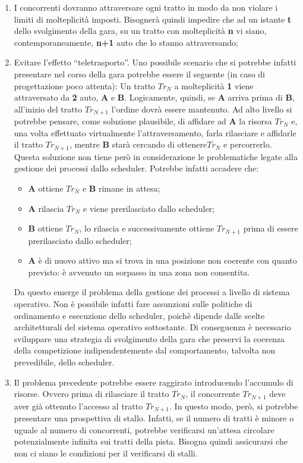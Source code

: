 \begin{enumerate}
\item I concorrenti dovranno attraversare ogni tratto in modo da non violare i limiti di molteplicit\`{a} imposti. Bisogner\`{a} quindi impedire che ad un istante \textbf{t} dello svolgimento della gara, su un tratto con molteplicit\`{a} \textbf{n} vi siano, contemporaneamente, \textbf{n+1} auto che lo stanno attraversando;
\item Evitare l'effetto ``teletrasporto''. Uno possibile scenario che si potrebbe infatti presentare nel corso della gara potrebbe essere il seguente (in caso di progettazione poco attenta):
Un tratto $Tr_N$ a molteplicit\`{a} \textbf{1} viene attraversato da \textbf{2} auto, \textbf{A} e \textbf{B}. Logicamente, quindi, se \textbf{A} arriva prima di \textbf{B}, all'inizio del tratto $Tr_{N+1}$ l'ordine dovr\`{a} essere mantenuto. Ad alto livello si potrebbe pensare, come soluzione plausibile, di affidare ad \textbf{A} la risorsa $Tr_N$ e, una volta effettuato virtualmente l'attraversamento, farla rilasciare e affidarle il tratto $Tr_{N+1}$, mentre \textbf{B} star\`{a} cercando di ottenere$Tr_N$ e percorrerlo.
Questa soluzione non tiene per\`{o} in considerazione le problematiche legate alla gestione dei processi dallo scheduler. Potrebbe infatti accadere che:
\begin{itemize}
\item \textbf{A} ottiene $Tr_N$ e \textbf{B} rimane in attesa;
\item \textbf{A} rilascia $Tr_N$ e viene prerilasciato dallo scheduler;
\item \textbf{B} ottiene $Tr_N$, lo rilascia e successivamente ottiene $Tr_{N+1}$ prima di essere prerilasciato dallo scheduler;
\item \textbf{A} \`{e} di nuovo attivo ma si trova in una posizione non coerente con quanto previsto: \`{e} avvenuto un sorpasso in una zona non consentita.
\end{itemize}
Da questo emerge il problema della gestione dei processi a livello di sistema operativo. Non \`{e} possibile infatti fare assunzioni sulle politiche di ordinamento e esecuzione dello scheduler, poich\`{e} dipende dalle scelte architetturali del sistema operativo sottostante. Di conseguenza \`{e} necessario sviluppare una strategia di svolgimento della gara che preservi la coerenza della competizione indipendentemente dal comportamento, talvolta non prevedibile, dello scheduler.
\item Il problema precedente potrebbe essere raggirato introducendo l'accumulo di risorse. Ovvero prima di rilasciare il tratto $Tr_N$, il concorrente $Tr_{N+1}$ deve aver gi\`{a} ottenuto l'accesso al tratto $Tr_{N+1}$. In questo modo, per\`{o}, si potrebbe presentare una prospettiva di stallo. Infatti, se il numero di tratti \`{e} minore o uguale al numero di concorrenti, potrebbe verificarsi un'attesa circolare potenzialmente infinita sui tratti della pista. Bisogna quindi assicurarsi che non ci siano le condizioni per il verificarsi di stalli.
\end{enumerate}

